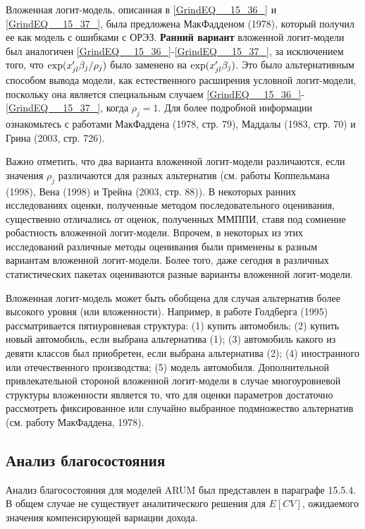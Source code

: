 Вложенная логит-модель, описанная в \eqref{GrindEQ__15_36_} и \eqref{GrindEQ__15_37_}, была предложена МакФадденом (1978), который получил ее как модель с ошибками с ОРЭЗ. \textbf{Ранний вариант } вложенной логит-модели был аналогичен \eqref{GrindEQ__15_36_}-\eqref{GrindEQ__15_37_}, за исключением того, что ${\rm exp}(x'_{jl}{\beta }_j/{\rho }_j)$ было заменено на ${\rm exp}(x'_{jl}{\beta }_j)$. Это было альтернативным способом вывода модели, как естественного расширения условной логит-модели, поскольку она является специальным случаем \eqref{GrindEQ__15_36_}-\eqref{GrindEQ__15_37_}, когда ${\rho }_j=1.$ Для более подробной информации ознакомьтесь с работами МакФаддена (1978, стр. 79), Маддалы (1983, стр. 70) и Грина (2003, стр. 726).

Важно отметить, что два варианта вложенной логит-модели различаются, если значения ${\rho }_j$ различаются для разных альтернатив (см. работы Коппельмана (1998), Вена (1998) и Трейна (2003, стр. 88)). В некоторых ранних исследованиях оценки, полученные методом последовательного оценивания, существенно отличались от оценок, полученных ММППИ, ставя под сомнение робастность вложенной логит-модели. Впрочем, в некоторых из этих исследований различные методы оценивания были применены к разным вариантам вложенной логит-модели. Более того, даже сегодня в различных статистических пакетах оцениваются разные варианты вложенной логит-модели.

Вложенная логит-модель может быть обобщена для случая альтернатив более высокого уровня (или вложенности). Например, в работе Голдберга (1995) рассматривается пятиуровневая структура: (1) купить автомобиль; (2) купить новый автомобиль, если выбрана альтернатива (1); (3) автомобиль какого из девяти классов был приобретен, если выбрана альтернатива (2); (4) иностранного или отечественного производства; (5) модель автомобиля. Дополнительной привлекательной стороной вложенной логит-модели в случае многоуровневой структуры вложенности является то, что для оценки параметров достаточно рассмотреть фиксированное или случайно выбранное подмножество альтернатив (см. работу МакФаддена, 1978).

\subsection{Анализ благосостояния}

Анализ благосостояния для моделей ARUM был представлен в параграфе 15.5.4. В общем случае не существует аналитического решения для $E\left[CV\right]$, ожидаемого значения компенсирующей вариации дохода.

